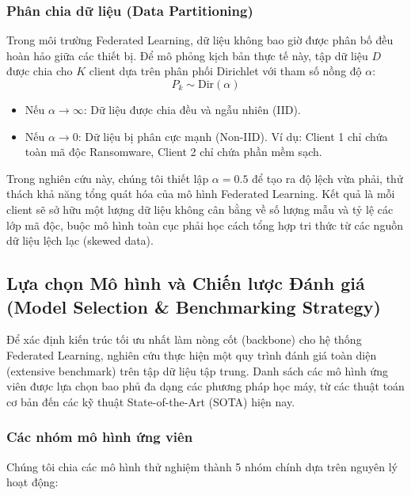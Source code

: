 \subsubsection{Phân chia dữ liệu (Data Partitioning)}
Trong môi trường Federated Learning, dữ liệu không bao giờ được phân bố đều hoàn hảo giữa các thiết bị. Để mô phỏng kịch bản thực tế này, tập dữ liệu $D$ được chia cho $K$ client dựa trên phân phối Dirichlet với tham số nồng độ $\alpha$:
$$P_k \sim \text{Dir}(\alpha)$$
\begin{itemize}
    \item Nếu $\alpha \rightarrow \infty$: Dữ liệu được chia đều và ngẫu nhiên (IID).
    \item Nếu $\alpha \rightarrow 0$: Dữ liệu bị phân cực mạnh (Non-IID). Ví dụ: Client 1 chỉ chứa toàn mã độc Ransomware, Client 2 chỉ chứa phần mềm sạch.
\end{itemize}
Trong nghiên cứu này, chúng tôi thiết lập $\alpha = 0.5$ để tạo ra độ lệch vừa phải, thử thách khả năng tổng quát hóa của mô hình Federated Learning. Kết quả là mỗi client sẽ sở hữu một lượng dữ liệu không cân bằng về số lượng mẫu và tỷ lệ các lớp mã độc, buộc mô hình toàn cục phải học cách tổng hợp tri thức từ các nguồn dữ liệu lệch lạc (skewed data).

\subsection{Lựa chọn Mô hình và Chiến lược Đánh giá (Model Selection \& Benchmarking Strategy)}

Để xác định kiến trúc tối ưu nhất làm nòng cốt (backbone) cho hệ thống Federated Learning, nghiên cứu thực hiện một quy trình đánh giá toàn diện (extensive benchmark) trên tập dữ liệu tập trung. Danh sách các mô hình ứng viên được lựa chọn bao phủ đa dạng các phương pháp học máy, từ các thuật toán cơ bản đến các kỹ thuật State-of-the-Art (SOTA) hiện nay.

\subsubsection{Các nhóm mô hình ứng viên}
Chúng tôi chia các mô hình thử nghiệm thành 5 nhóm chính dựa trên nguyên lý hoạt động:


